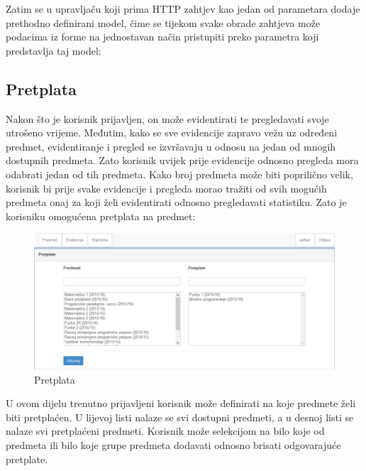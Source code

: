 \documentclass[times, utf8, zavrsni]{fer}
\begin{document}
\lstset{style=html}


\clearpage
Zatim se u upravljaču koji prima HTTP zahtjev kao jedan od parametara dodaje prethodno definirani model, čime se tijekom svake obrade zahtjeva može podacima iz forme na jednostavan način pristupiti preko parametra koji predstavlja taj model:

\lstset{style=csharp}


\subsection{Pretplata}
Nakon što je korisnik prijavljen, on može evidentirati te pregledavati svoje utrošeno vrijeme. Međutim, kako se sve evidencije zapravo vežu uz određeni predmet, evidentiranje i pregled se izvršavaju u odnosu na jedan od mnogih dostupnih predmeta. Zato korisnik uvijek prije evidencije odnosno pregleda mora odabrati jedan od tih predmeta. Kako broj predmeta može biti poprilično velik, korisnik bi prije svake evidencije i pregleda morao tražiti od svih mogućih predmeta onaj za koji želi evidentirati odnosno pregledavati statistiku. Zato je korisniku omogućena pretplata na predmet:

\begin{figure}[H]
\centering
\includegraphics[width=\textwidth,height=\textheight,keepaspectratio]{img/pretplata-web.png}
\caption{Pretplata}
\label{fig:pretplata-web}
\end{figure}
\clearpage

U ovom dijelu trenutno prijavljeni korisnik može definirati na koje predmete želi biti pretplaćen. U lijevoj listi nalaze se svi dostupni predmeti, a u desnoj listi se nalaze svi pretplaćeni predmeti. Korisnik može selekcijom na bilo koje od predmeta ili bilo koje grupe predmeta dodavati odnosno brisati odgovarajuće pretplate. \\
\end{document}
